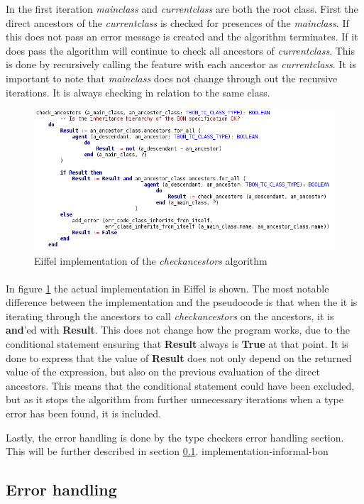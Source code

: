 In the first iteration \textit{main}\textunderscore\textit{class} and \textit{current}\textunderscore\textit{class} are both the root class. First the direct ancestors of the \textit{current}\textunderscore\textit{class}  is checked for presences of the \textit{main}\textunderscore\textit{class}. If this does not pass an error message is created and the algorithm terminates. If it does pass the algorithm will continue to check all ancestors of \textit{current}\textunderscore\textit{class}. This is done by recursively calling the feature with each ancestor as \textit{current}\textunderscore\textit{class}. It is important to note that \textit{main}\textunderscore\textit{class} does not change through out the recursive iterations. It is always checking in relation to the same class.

\begin{figure}
\centerline{
\includegraphics[scale=0.7]{images/check_ancestors_eiffel_code.png}
}
\caption{Eiffel implementation of the \textit{check}\textunderscore\textit{ancestors} algorithm}
\label{fig:eiffel_check_ancestors}
\end{figure}

\paragraph{}
In figure \ref{fig:eiffel_check_ancestors} the actual implementation in Eiffel is shown. The most notable difference between the implementation and the pseudocode is that when the it is iterating through the ancestors to call \textit{check}\textunderscore\textit{ancestors} on the ancestors, it is \textbf{and}'ed with \textbf{Result}. This does not change how the program works, due to the conditional statement ensuring that \textbf{Result} always is \textbf{True} at that point. It is done to express that the value of \textbf{Result} does not only depend on the returned value of the expression, but also on the previous evaluation of the direct ancestors. This means that the conditional statement could have been excluded, but as it stops the algorithm from further unnecessary iterations when a type error has been found, it is included.

Lastly, the error handling is done by the type checkers error handling section. This will be further described in section \ref{error_section}.
{implementation-informal-bon}

\subsection{Error handling}
\label{error_section}